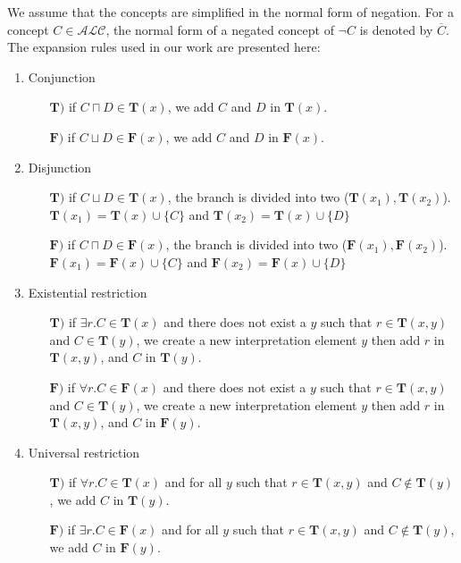 \documentclass{article}
\begin{document}
We assume that the concepts are simplified in the normal form of negation. For a concept $C \in \mathcal{ALC} $, the normal form of a negated concept of $\neg C$ is denoted by $\overline{C}$.
The expansion rules used in our work are presented here:
\begin{enumerate}
	 \item Conjunction
	       \begin{itemize}
	        \item  [$\mathbf{T)}$] if $C\sqcap D \in \mathbf{T}(x)$, we add $C$ and $D$ in $\mathbf{T}(x)$.
	        \item  [$\mathbf{F)}$] if $C\sqcup D \in \mathbf{F}(x)$, we add $C$ and $D$ in $\mathbf{F}(x)$.
	       \end{itemize}
	 \item Disjunction
	       \begin{itemize}
		\item  [$\mathbf{T)}$]  if $C\sqcup D \in \mathbf{T}(x)$, the branch is divided into two  ($\mathbf{T}(x_1),\mathbf{T}(x_2)$).
			$\mathbf{T}(x_1)= \mathbf{T}(x) \cup \{C\}$ and $\mathbf{T}(x_2)=\mathbf{T}(x) \cup \{D\}$
	        \item  [$\mathbf{F)}$]  if $C\sqcap D \in \mathbf{F}(x)$, the branch is divided into two ($\mathbf{F}(x_1),\mathbf{F}(x_2)$).
	        $\mathbf{F}(x_1)= \mathbf{F}(x) \cup \{C\}$ and $\mathbf{F}(x_2)=\mathbf{F}(x) \cup \{D\}$
	       \end{itemize}
	 \item Existential restriction
	       \begin{itemize}
	       \item  [$\mathbf{T)}$]  if $\exists r.C \in \mathbf{T}(x)$ and there does not exist a $y$ such that $r \in \mathbf{T}(x,y)$ and $C \in \mathbf{T}(y)$, 
	       we create a new interpretation element $y$  then add $r$ in  $\mathbf{T}(x,y)$, and $C$ in $\mathbf{T}(y)$.
	        \item  [$\mathbf{F)}$]  if $\forall r.C \in \mathbf{F}(x)$ and there does not exist a $y$ such that $r \in \mathbf{T}(x,y)$ and $C \in \mathbf{T}(y)$, 
	       we create a new interpretation element $y$ then add $r$ in  $\mathbf{T}(x,y)$, and $C$ in $\mathbf{F}(y)$.
	       \end{itemize}
	 \item Universal restriction
	       \begin{itemize}
 	        \item  [$\mathbf{T)}$]  if $\forall r.C \in \mathbf{T}(x)$ and for all $y$ such that $r \in \mathbf{T}(x,y)$ and $C\notin\mathbf{T}(y)$, we add $C$ in  $\mathbf{T}(y)$.
	        \item  [$\mathbf{F)}$]  if $\exists r.C \in \mathbf{F}(x)$ and for all $y$ such that $r \in \mathbf{T}(x,y)$ and $C\notin\mathbf{T}(y)$, we add $C$ in  $\mathbf{F}(y)$.
	       \end{itemize}	


\end{enumerate}
\end{document}
